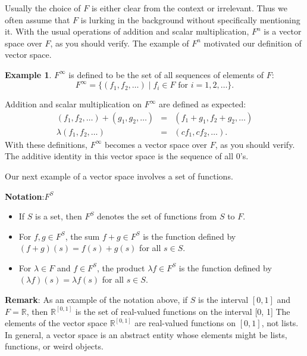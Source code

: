 \documentclass[
]{book}
\providecommand{\tightlist}{%
  \setlength{\itemsep}{0pt}\setlength{\parskip}{0pt}}
\theoremstyle{definition}
\theoremstyle{definition}
\newtheorem{example}{Example}[chapter]
\theoremstyle{definition}
\theoremstyle{definition}
\theoremstyle{remark}
\begin{document}
Usually the choice of \(F\) is either clear from the context or irrelevant. Thus we often assume that \(F\) is lurking in the background without specifically mentioning it. With the usual operations of addition and scalar multiplication, \(F^n\) is a vector space over \(F\), as you should verify. The example of \(F^n\) motivated our definition of vector space.

\begin{example}
\protect\hypertarget{exm:unnamed-chunk-29}{}\label{exm:unnamed-chunk-29}\(F^\infty\) is defined to be the set of all sequences of elements of \(F\):
\[F^\infty = \{(f_1, f_2, \ldots) \mid f_i \in F \text{ for } i = 1, 2, \ldots\}.\]

Addition and scalar multiplication on \(F^\infty\) are defined as expected:
\begin{eqnarray*}
(f_1, f_2, \ldots) + (g_1, g_2, \ldots) &=& (f_1 + g_1, f_2 + g_2, \ldots)\\
\lambda(f_1, f_2, \ldots) &=& (cf_1, cf_2, \ldots).
\end{eqnarray*}
With these definitions, \(F^\infty\) becomes a vector space over \(F\), as you should verify.
The additive identity in this vector space is the sequence of all 0's.
\end{example}

Our next example of a vector space involves a set of functions.

\textbf{Notation}:\(F^S\)

\begin{itemize}
\tightlist
\item
  If \(S\) is a set, then \(F^S\) denotes the set of functions from \(S\) to \(F\).
\item
  For \(f,g \in F^S\), the sum \(f + g \in F^S\) is the function defined by \((f + g)(s) = f(s) + g(s)\) for all \(s \in S\).
\item
  For \(\lambda \in F\) and \(f \in F^S\), the product \(\lambda f \in F^S\) is the function defined by \((\lambda f)(s) = \lambda f(s)\) for all \(s \in S\).
\end{itemize}

\textbf{Remark}: As an example of the notation above, if \(S\) is the interval \([0, 1]\) and \(F=\mathbb{R}\), then \(\mathbb{R}^{[0,1]}\) is the set of real-valued functions on the interval {[}0, 1{]}
The elements of the vector space \(\mathbb{R}^{[0,1]}\)
are real-valued functions on \([0, 1]\), not
lists. In general, a vector space is an
abstract entity whose elements might
be lists, functions, or weird objects.
\end{document}
